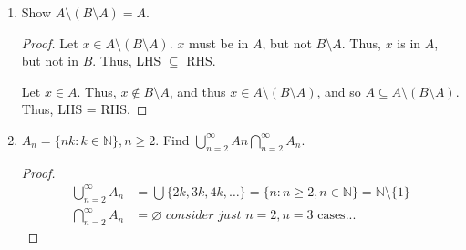 \documentclass[12pt]{article}
\begin{document}
\begin{enumerate}
\begin{enumerate}
\begin{proof}[Proof]
      $P_5: (\frac{1+\sqrt{5}{2}})^3 \dots < 5$

      Take $P_{n-1}, P_{n}$ to hold, ie $F_{n-1}>\varphi^{n-3}$ and $F_n > \varphi^{n-2}$.
      \begin{align*}
        F_{n+1} = F_n + F_{n-1} &> \varphi^{n-2} + \varphi^{n-3}\\
        &= \varphi^{n-3}(\underbrace{\varphi+1}_{=\varphi^2})\\
        &= \varphi^{n-1},
      \end{align*} as desired, Noting that $\varphi + 1 = \frac{1+\sqrt{5}}{2} + 1 = \frac{1 + \sqrt{5}+2}{2} = \dots \varphi^2$.
    \end{proof}
    \item $a_1 = 1, a_2 = 8, a_n = a_{n-1} + 2 a_{n-2}$. Prove $a_n = 3 \cdot 2^{n-1} + 2 (-1)^n$.
    \begin{proof}[Proof]
      $a_1 = 1 =  3 \cdot 2^0 + 2(-1)^1 =3 -2 = 1$
      $a_2 = 8 = 3\cdot 2^1 + 2(-1)^2 = 6+2 = 8$
      So, $P_1, P_2$ holds. Assume $P_n$, $P_{n+1}$ holds. Then, we have $a_n = 3 \cdot 2^{n-1} + 2(-1)^n$ and so:
      \begin{align*}
        a_{n+1} &= 3 \cdot 2 ^{n-1} + 2(-1)^{n} + 2 \cdot \left(3\cdot 2^{n-2}+2(-1)^{n-1}\right)\\
        &= \dots = 3\cdot 2^n + 2(-1)^{n+1}
      \end{align*}
      Thus, proven.
    \end{proof}
  \end{enumerate}
  \item Show $A \setminus (B \setminus A) = A$.
  \begin{proof}[Proof]
    Let $x \in A \setminus(B \setminus A)$. $x$ must be in $A$, but not $B \setminus A$. Thus, $x$ is in $A$, but not in $B$. Thus, LHS $\subseteq$ RHS.

    Let $x \in A$. Thus, $x \notin B \setminus A$, and thus $x \in A \setminus (B\setminus A)$, and so $A \subseteq A \setminus (B \setminus A)$. Thus, LHS = RHS.

  \end{proof}

  \item $A_n = \{nk : k \in \mathbb{N}\}, n \geq 2$. Find $\bigcup_{n=2}^\infty An \bigcap_{n=2}^\infty A_n$.
  \begin{proof}
    \begin{align*}
      \bigcup_{n=2}^\infty A_n & = \bigcup \{2k, 3k, 4k, \dots\} = \{n : n \geq 2, n \in \mathbb{N}\} = \mathbb{N}\setminus \{1\}\\
      \bigcap_{n=2}^\infty A_n &= \varnothing \textit{ consider just } n=2, n=3 \text{ cases...}
    \end{align*}
  \end{proof}
\end{enumerate}
\end{document}
